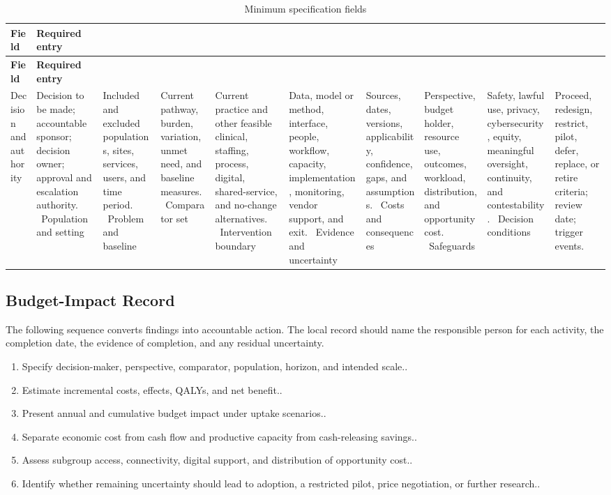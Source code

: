 \begin{longtable}{@{}p{}p{}@{}}
\caption{Minimum specification fields}
\label{tab:comp-ch07-spec-fields}\\
\toprule
\textbf{Field} & \textbf{Required entry} \\
\midrule
\endfirsthead
\toprule
\textbf{Field} & \textbf{Required entry} \\
\midrule
\endhead
\bottomrule
\endlastfoot
Decision and authority & Decision to be made; accountable sponsor; decision owner; approval and escalation authority. \
Population and setting & Included and excluded populations, sites, services, users, and time period. \
Problem and baseline & Current pathway, burden, variation, unmet need, and baseline measures. \
Comparator set & Current practice and other feasible clinical, staffing, process, digital, shared-service, and no-change alternatives. \
Intervention boundary & Data, model or method, interface, people, workflow, capacity, implementation, monitoring, vendor support, and exit. \
Evidence and uncertainty & Sources, dates, versions, applicability, confidence, gaps, and assumptions. \
Costs and consequences & Perspective, budget holder, resource use, outcomes, workload, distribution, and opportunity cost. \
Safeguards & Safety, lawful use, privacy, cybersecurity, equity, meaningful oversight, continuity, and contestability. \
Decision conditions & Proceed, redesign, restrict, pilot, defer, replace, or retire criteria; review date; trigger events. \
\end{longtable}

\subsection{Budget-Impact Record}
\label{sec:comp-ch07-supp-2}
The following sequence converts findings into accountable action. The local record
should name the responsible person for each activity, the completion date, the
evidence of completion, and any residual uncertainty.

\begin{enumerate}
 \item Specify decision-maker, perspective, comparator, population, horizon, and intended scale..
 \item Estimate incremental costs, effects, QALYs, and net benefit..
 \item Present annual and cumulative budget impact under uptake scenarios..
 \item Separate economic cost from cash flow and productive capacity from cash-releasing savings..
 \item Assess subgroup access, connectivity, digital support, and distribution of opportunity cost..
 \item Identify whether remaining uncertainty should lead to adoption, a restricted pilot, price negotiation, or further research..
\end{enumerate}

